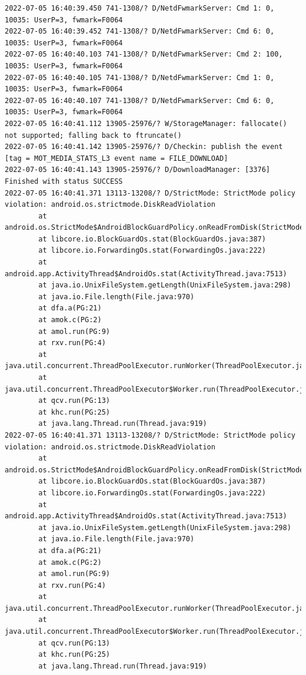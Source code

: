 \documentclass[a4paper,12pt]{book}
\begin{document}
\begin{lstlisting}
2022-07-05 16:40:39.450 741-1308/? D/NetdFwmarkServer: Cmd 1: 0, 10035: UserP=3, fwmark=F0064
2022-07-05 16:40:39.452 741-1308/? D/NetdFwmarkServer: Cmd 6: 0, 10035: UserP=3, fwmark=F0064
2022-07-05 16:40:40.103 741-1308/? D/NetdFwmarkServer: Cmd 2: 100, 10035: UserP=3, fwmark=F0064
2022-07-05 16:40:40.105 741-1308/? D/NetdFwmarkServer: Cmd 1: 0, 10035: UserP=3, fwmark=F0064
2022-07-05 16:40:40.107 741-1308/? D/NetdFwmarkServer: Cmd 6: 0, 10035: UserP=3, fwmark=F0064
2022-07-05 16:40:41.112 13905-25976/? W/StorageManager: fallocate() not supported; falling back to ftruncate()
2022-07-05 16:40:41.142 13905-25976/? D/Checkin: publish the event [tag = MOT_MEDIA_STATS_L3 event name = FILE_DOWNLOAD]
2022-07-05 16:40:41.143 13905-25976/? D/DownloadManager: [3376] Finished with status SUCCESS
2022-07-05 16:40:41.371 13113-13208/? D/StrictMode: StrictMode policy violation: android.os.strictmode.DiskReadViolation
        at android.os.StrictMode$AndroidBlockGuardPolicy.onReadFromDisk(StrictMode.java:1571)
        at libcore.io.BlockGuardOs.stat(BlockGuardOs.java:387)
        at libcore.io.ForwardingOs.stat(ForwardingOs.java:222)
        at android.app.ActivityThread$AndroidOs.stat(ActivityThread.java:7513)
        at java.io.UnixFileSystem.getLength(UnixFileSystem.java:298)
        at java.io.File.length(File.java:970)
        at dfa.a(PG:21)
        at amok.c(PG:2)
        at amol.run(PG:9)
        at rxv.run(PG:4)
        at java.util.concurrent.ThreadPoolExecutor.runWorker(ThreadPoolExecutor.java:1167)
        at java.util.concurrent.ThreadPoolExecutor$Worker.run(ThreadPoolExecutor.java:641)
        at qcv.run(PG:13)
        at khc.run(PG:25)
        at java.lang.Thread.run(Thread.java:919)
2022-07-05 16:40:41.371 13113-13208/? D/StrictMode: StrictMode policy violation: android.os.strictmode.DiskReadViolation
        at android.os.StrictMode$AndroidBlockGuardPolicy.onReadFromDisk(StrictMode.java:1571)
        at libcore.io.BlockGuardOs.stat(BlockGuardOs.java:387)
        at libcore.io.ForwardingOs.stat(ForwardingOs.java:222)
        at android.app.ActivityThread$AndroidOs.stat(ActivityThread.java:7513)
        at java.io.UnixFileSystem.getLength(UnixFileSystem.java:298)
        at java.io.File.length(File.java:970)
        at dfa.a(PG:21)
        at amok.c(PG:2)
        at amol.run(PG:9)
        at rxv.run(PG:4)
        at java.util.concurrent.ThreadPoolExecutor.runWorker(ThreadPoolExecutor.java:1167)
        at java.util.concurrent.ThreadPoolExecutor$Worker.run(ThreadPoolExecutor.java:641)
        at qcv.run(PG:13)
        at khc.run(PG:25)
        at java.lang.Thread.run(Thread.java:919)

\end{lstlisting}
\end{document}
